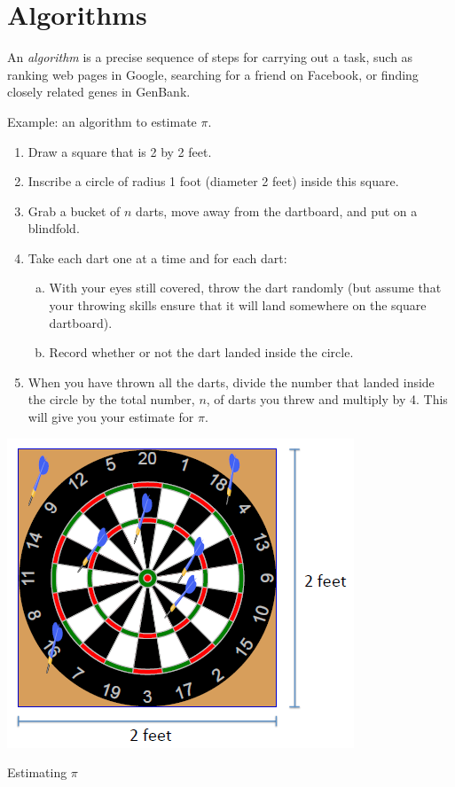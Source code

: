 \documentclass[8pt,a4paper,compress,handout]{beamer}
\begin{document}
\section{Algorithms}
\begin{frame}[fragile]
An \emph{algorithm} is a precise sequence of steps for carrying out a task, such as ranking web pages in Google, searching for a friend on Facebook, or finding closely related genes in GenBank.

\bigskip

Example: an algorithm to estimate $\pi$.

\bigskip

\begin{minipage}{200pt}
\begin{enumerate}
\item Draw a square that is 2 by 2 feet.
\item Inscribe a circle of radius 1 foot (diameter 2 feet) inside this square.
\item Grab a bucket of $n$ darts, move away from the dartboard, and put on a blindfold.
\item Take each dart one at a time and for each dart:
\begin{enumerate}[a.]
\item With your eyes still covered, throw the dart randomly (but assume that your throwing skills ensure that it will land somewhere on the square dartboard).
\item Record whether or not the dart landed inside the circle.
\end{enumerate}
\item When you have thrown all the darts, divide the number that landed inside the circle by the total number, $n$, of darts you threw and multiply by 4. This will give you your estimate for $\pi$.
\end{enumerate}
\end{minipage}\hfill %
\begin{minipage}{100pt}
\begin{center}
\includegraphics[scale=0.3]{figures/estimating_pi.png}

\smallskip

\tiny Estimating $\pi$
\end{center}
\end{minipage}
\end{frame}
\end{document}
